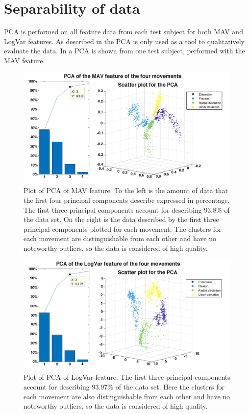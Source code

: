 \section{Separability of data}

PCA is performed on all feature data from each test subject for both MAV and LogVar features. As described in  the PCA is only used as a tool to qualitatively evaluate the data. In  a PCA is shown from one test subject, performed with the MAV feature. 

\begin{figure}[H]
	\includegraphics[height=0.35\textheight,width=1\textwidth]{figures/results/pcasubplotMAV.png} 
	\caption{Plot of PCA of MAV feature. To the left is the amount of data that the first four principal components describe expressed in percentage. The first three principal components account for describing $93.8\%$ of the data set. On the right is the data described by the first three principal components plotted for each movement. The clusters for each movement are distinguishable from each other and have no noteworthy outliers, so the data is considered of high quality.} 
	\label{fig:pcasubplotMAV}
\end{figure} 

\begin{figure}[H]
	\includegraphics[height=0.35\textheight,width=1\textwidth]{figures/results/pcasubplotLogVar.png} 
	\caption{Plot of PCA of LogVar feature. The first three principal components account for describing $93.97\%$ of the data set. Here the clusters for each movement are also distinguishable from each other and have no noteworthy outliers, so the data is considered of high quality.} 
	\label{fig:pcasubplotLogVar}
\end{figure}

